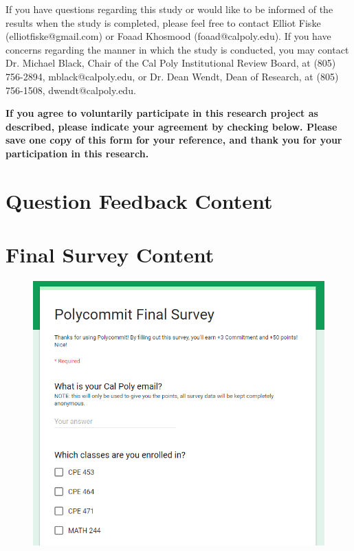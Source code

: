 If you have questions regarding this study or would like to be informed of the results when the study is completed, please feel free to contact Elliot Fiske (elliotfiske@gmail.com) or Foaad Khosmood (foaad@calpoly.edu).  If you have concerns regarding the manner in which the study is conducted, you may contact Dr. Michael Black, Chair of the Cal Poly Institutional Review Board, at (805) 756-2894, mblack@calpoly.edu, or Dr. Dean Wendt, Dean of Research, at (805) 756-1508, dwendt@calpoly.edu.

\textbf{If you agree to voluntarily participate in this research project as described, please indicate your agreement by checking below. Please save one copy of this form for your reference, and thank you for your participation in this research.}

\chapter{Question Feedback Content}
\label{appendix:question_feedback}


\chapter{Final Survey Content}
\label{appendix:final_survey}

\begin{figure}[h!]
	\includegraphics[width=1.0\linewidth]{figures/survey1}
	\label{fig:survey1}
\end{figure}

